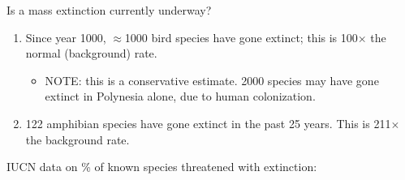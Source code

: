 \begin{frame}[t]
    \begin{adjustwidth}{-2em}{-1.5em}
        Is a mass extinction currently underway?


        \begin{enumerate}
            \item<3-> Since year 1000, $\approx$1000 bird species have gone
                extinct; this is 100$\times$ the normal (background) rate.

            \begin{itemize}
                \item NOTE: this is a conservative estimate. 2000 species may
                    have gone extinct in Polynesia alone, due to human
                    colonization.
            \end{itemize}

            \vspace{8mm}
            \item<4-> 122 amphibian species have gone extinct in the past 25
                years.  This is 211$\times$ the background rate.
        \end{enumerate}
    \end{adjustwidth}
\end{frame}

\begin{frame}[t]
    \begin{adjustwidth}{-2em}{-1.5em}
        IUCN data on \% of known species threatened with extinction:


    \end{adjustwidth}
\end{frame}

